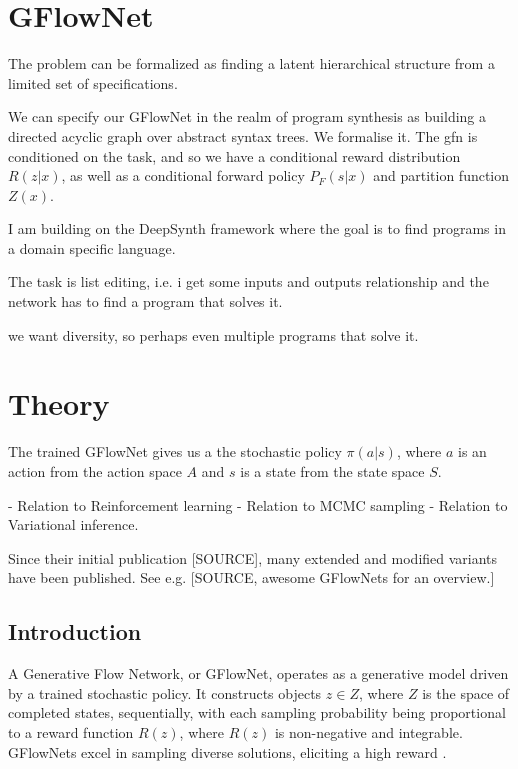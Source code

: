 \section{GFlowNet}
The problem can be formalized as finding a latent hierarchical structure from a limited set of specifications.

We can specify our GFlowNet in the realm of program synthesis as building a directed acyclic graph over abstract syntax trees.
We formalise it. 
The gfn is conditioned on the task, and so we have a conditional reward distribution $R(z|x)$, as well as a conditional forward policy $P_F(s|x)$ and partition function $Z(x)$.

I am building on the DeepSynth framework where the goal is to find programs in a domain specific language. 

The task is list editing, i.e. i get some inputs and outputs relationship and the network has to find a program that solves it. 

we want diversity, so perhaps even multiple programs that solve it. 



\section{Theory}


The trained GFlowNet gives us a the stochastic policy $\pi(a|s)$, where $a$ is an action from the action space $A$ and $s$ is a state from the state space $S$.

- Relation to Reinforcement learning
- Relation to MCMC sampling
- Relation to Variational inference. 

Since their initial publication [SOURCE], many extended and modified variants have been published. See e.g. [SOURCE, awesome GFlowNets for an overview.]




\subsection{Introduction}
A Generative Flow Network, or GFlowNet, operates as a generative model driven by a trained stochastic policy. It constructs objects $z \in Z$, where $Z$ is the space of completed states, sequentially, with each sampling probability being proportional to a reward function $R(z)$, where $R(z)$ is non-negative and integrable. GFlowNets excel in sampling diverse solutions, eliciting a high reward \cite{bengio_flow_2021}.

